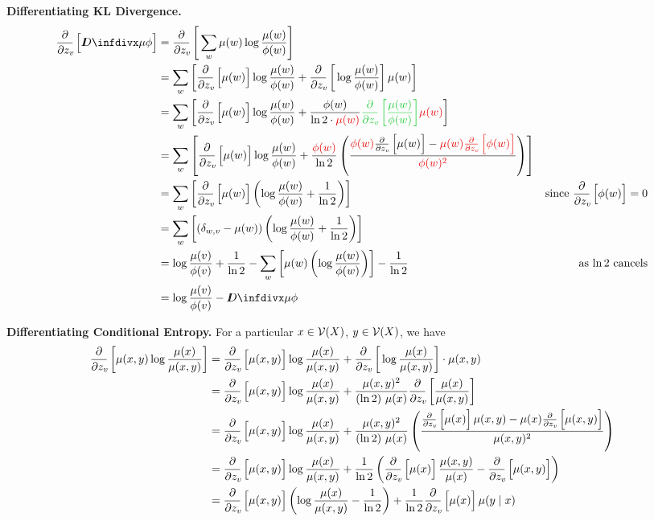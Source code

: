 \documentclass{article}
\begin{document}
	\textbf{Differentiating KL Divergence.}
	\begin{align*}
		\pz{\kldiv{\mu}{\phi}} &= \pz{\sum_w \mu(w) \log \frac{\mu(w)}{\phi(w)}} \\
			&= \sum_w \left[ \pz{\mu(w)} \log \frac{\mu(w)}{\phi(w)} + \pz{\log\frac{\mu(w)}{\phi(w)} }\mu(w) \right] \\
			&=\sum_w \left[ \pz{\mu(w)} \log \frac{\mu(w)}{\phi(w)} + \frac{\phi(w)}{\ln 2\cdot\color{eliminate}\mu(w)} {\color{expand}\pz{\frac{\mu(w)}{\phi(w)}}} {\color{eliminate}\mu(w)} \right] \\
			&=\sum_w \left[ \pz{\mu(w)} \log \frac{\mu(w)}{\phi(w)} + \frac{\color{eliminate}\phi(w)}{\ln 2} 	\left(\frac{{\color{eliminate}\phi(w)} \pz{\mu(w)} - {\color{eliminate}\mu(w) \pz{\phi(w)}}}{\color{eliminate}\phi(w)^2}\right)  \right] \\
			&=\sum_w \left[ \pz{\mu(w)} \left(\log \frac{\mu(w)}{\phi(w)} + \frac{1}{\ln 2} \right) \right] & \text{since $\pz{\phi(w)} = 0$}\\
			&=\sum_w \left[ (\delta_{w,v} - \mu(w)) \left(\log \frac{\mu(w)}{\phi(w)} + \frac{1}{\ln 2} \right) \right] \\
			&= \log \frac{\mu(v)}{\phi(v)} + \frac{1}{\ln 2} - \sum_w \left[ \mu(w) \left(\log \frac{\mu(w)}{\phi(w)}  \right) \right] - \frac{1}{\ln 2} 
				&\text{as $\ln 2$ cancels}\\
			&= \log \frac{\mu(v)}{\phi(v)} - \kldiv{\mu}{\phi} \\
	\end{align*}
	
	\textbf{Differentiating Conditional Entropy.}
	For a particular $x \in \mathcal V(X)$, $y \in \mathcal V(X)$, we have
	\begin{align*}
		\pz{\mu(x,y) \log \frac{\mu(x)}{\mu(x,y)}}
		&= \pz{\mu(x,y)} \log \frac{\mu(x)}{\mu(x,y)} + \pz{\log \frac{\mu(x)}{\mu(x,y)}} \cdot \mu(x,y) \\
		&= \pz{\mu(x,y)} \log \frac{\mu(x)}{\mu(x,y)} + \frac{\mu(x,y)^2}{(\ln 2)\ \mu(x) } \pz{\frac{\mu(x)}{\mu(x,y)}} \\
		&= \pz{\mu(x,y)} \log \frac{\mu(x)}{\mu(x,y)} + \frac{\mu(x,y)^2}{(\ln 2)\ \mu(x) } \left(\frac{ \pz{\mu(x)} \mu(x,y) - \mu(x) \pz{\mu(x,y)}}{\mu(x,y)^2} \right) \\
		&= \pz{\mu(x,y)} \log \frac{\mu(x)}{\mu(x,y)} + \frac{1}{\ln 2} \left( \pz{\mu(x)} \frac{\mu(x,y)}{\mu(x)} - \pz{\mu(x,y)} \right) \\
		&= \pz{\mu(x,y)} \left(\log \frac{\mu(x)}{\mu(x,y)} - \frac{1}{\ln 2}\right) +  \frac{1}{\ln 2} \pz{\mu(x)} \mu(y \mid x) \\
	\end{align*}
	
\end{document}
